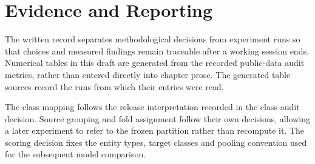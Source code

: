 
\chapter{Evidence and Reporting}
\label{ch:evidence}

The written record separates methodological decisions from experiment runs so
that choices and measured findings remain traceable after a working session ends.
Numerical tables in this draft are generated from the recorded public-data audit
metrics, rather than entered directly into chapter prose.
The generated table sources record the runs from which their entries were read.

The class mapping follows the release interpretation recorded in the class-audit
decision.
Source grouping and fold assignment follow their own decisions, allowing a later
experiment to refer to the frozen partition rather than recompute it.
The scoring decision fixes the entity types, target classes and pooling convention
used for the subsequent model comparison.
